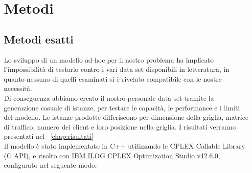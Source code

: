  \chapter{Metodi} \label{cap:metodi}

\ifpdf
    \graphicspath{{Chapter6/Figs/Raster/}{Chapter6/Figs/PDF/}{Chapter6/Figs/}}
\else
    \graphicspath{{Chapter6/Figs/Vector/}{Chapter6/Figs/}}
\fi

\section{Metodi esatti}
Lo sviluppo di un modello ad-hoc per il nostro problema ha implicato l'impossibilità di testarlo contro i vari data set disponibili in letteratura, in quanto nessuno di quelli esaminati si è rivelato compatibile con le nostre necessità. \\
Di conseguenza abbiamo creato il nostro personale data set tramite la generazione casuale di istanze, per testare le capacità, le performance e i limiti del modello. Le istanze prodotte differiscono per dimensione della griglia, matrice di traffico, numero dei client e loro posizione nella griglia. I risultati verranno presentati nel \chaptername\ \ref{chap:risultati} \\
Il modello è stato implementato in C++ utilizzando le CPLEX Callable Library (C API), e risolto con IBM ILOG CPLEX Optimization Studio v12.6.0, configurato nel seguente modo:

